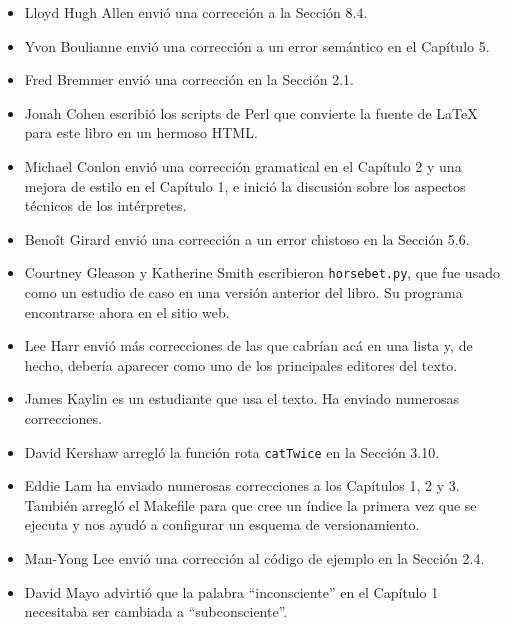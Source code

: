 \documentclass[10pt]{book}
\begin{document}
\begin{itemize}

\small
\item Lloyd Hugh Allen envió una corrección a la Sección 8.4.

\item Yvon Boulianne envió una corrección a un error semántico en
el Capítulo 5.

\item Fred Bremmer envió una corrección en la Sección 2.1.

\item Jonah Cohen escribió los scripts de Perl que convierte la
fuente de LaTeX para este libro en un hermoso HTML.

\item Michael Conlon envió una corrección gramatical en el Capítulo 2
y una mejora de estilo en el Capítulo 1, e inició la discusión
sobre los aspectos técnicos de los intérpretes.

\item Beno\^{i}t Girard envió una
corrección a un error chistoso en la Sección 5.6.

\item Courtney Gleason y Katherine Smith escribieron {\tt horsebet.py}, que
fue usado como un estudio de caso en una versión anterior del libro.  Su
programa encontrarse ahora en el sitio web.

\item Lee Harr envió más correcciones de las que cabrían acá en una lista
y, de hecho, debería aparecer como uno de los principales editores
del texto.

\item James Kaylin es un estudiante que usa el texto. Ha enviado
numerosas correcciones.

\item David Kershaw arregló la función rota {\tt catTwice} en la Sección
3.10.

\item Eddie Lam ha enviado numerosas correcciones a los Capítulos
1, 2 y 3.
También arregló el Makefile para que cree un índice la primera vez que
se ejecuta y nos ayudó a configurar un esquema de versionamiento.

\item Man-Yong Lee envió una corrección al código de ejemplo en la
Sección 2.4.

\item David Mayo advirtió que la palabra ``inconsciente''
en el Capítulo 1 necesitaba
ser cambiada a ``subconsciente''.


\end{itemize}
\end{document}
